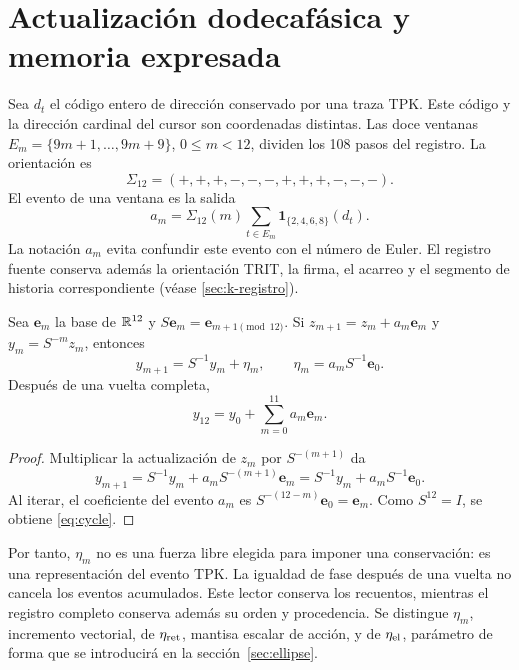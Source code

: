 \section{Actualización dodecafásica y memoria expresada}
\label{sec:eta}
Sea $d_t$ el código entero de dirección conservado por una traza TPK.
Este código y la dirección cardinal del cursor son coordenadas distintas.
Las doce ventanas
$E_m=\{9m+1,\ldots,9m+9\}$, $0\le m<12$, dividen los 108 pasos del registro.
La orientación es
\[
\Sigma_{12}=(+,+,+,-,-,-,+,+,+,-,-,-).
\]
El evento de una ventana es la salida
\begin{equation}
a_m=\Sigma_{12}(m)
\sum_{t\in E_m}\mathbf1_{\{2,4,6,8\}}(d_t).
\label{eq:events}
\end{equation}
La notación $a_m$ evita confundir este evento con el número de Euler.
El registro fuente conserva además la orientación TRIT, la firma,
el acarreo y el segmento de historia correspondiente (véase \ref{sec:k-registro}).

\begin{proposition}
Sea $\mathbf e_m$ la base de $\mathbb R^{12}$ y
$S\mathbf e_m=\mathbf e_{m+1\pmod{12}}$. Si
$z_{m+1}=z_m+a_m\mathbf e_m$ y $y_m=S^{-m}z_m$, entonces
\begin{equation}
y_{m+1}=S^{-1}y_m+\eta_m,
\qquad
\eta_m=a_mS^{-1}\mathbf e_0.
\label{eq:eta}
\end{equation}
Después de una vuelta completa,
\begin{equation}
y_{12}=y_0+\sum_{m=0}^{11}a_m\mathbf e_m.
\label{eq:cycle}
\end{equation}
\end{proposition}
\begin{proof}
Multiplicar la actualización de $z_m$ por $S^{-(m+1)}$ da
\[
y_{m+1}=S^{-1}y_m+a_mS^{-(m+1)}\mathbf e_m
=S^{-1}y_m+a_mS^{-1}\mathbf e_0.
\]
Al iterar, el coeficiente del evento $a_m$ es
$S^{-(12-m)}\mathbf e_0=\mathbf e_m$. Como $S^{12}=I$,
se obtiene \eqref{eq:cycle}.
\end{proof}

Por tanto, $\eta_m$ no es una fuerza libre elegida para imponer una
conservación: es una representación del evento TPK. La igualdad de fase
después de una vuelta no cancela los eventos acumulados. Este lector
conserva los recuentos, mientras el registro completo conserva además su
orden y procedencia. Se distingue $\eta_m$, incremento vectorial, de
$\eta_{\rm ret}$, mantisa escalar de acción, y de $\eta_{\rm el}$,
parámetro de forma que se introducirá en la sección~\ref{sec:ellipse}.

